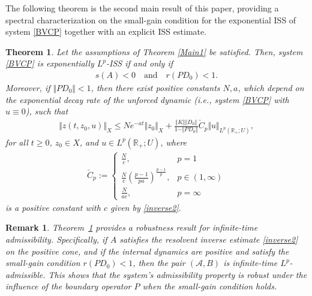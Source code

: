 \documentclass[onecolumn]{autart}
\def\R{{\mathbb{R}}}
\def\R{\mathbb R}
\newtheorem{theorem}{Theorem}[section]  %
\newtheorem{remark}{Remark}[section]
\numberwithin{equation}{section}
\begin{document}
	The following theorem is the second main result of this paper, providing a spectral characterization on the small-gain condition for the  exponential ISS of system \eqref{BVCP} together with an explicit ISS estimate.
	
	\begin{theorem}\label{Main2}
		Let the assumptions of Theorem \ref{Main1} be satisfied. Then, system \eqref{BVCP} is exponentially $L^p$-ISS if and only if
		\begin{align}\label{characterization}
			s(A) < 0 \quad \text{and} \quad r(P D_0) < 1.
		\end{align}
		Moreover, if $\Vert P D_0\Vert<1$, then there exist positive constants $N,a $, which  depend on the exponential decay rate of  the unforced  dynamic (i.e., system \eqref{BVCP} with $u \equiv 0$), such that
		\begin{align}\label{ISS-estimate}
			\Vert z(t,z_0,u)\Vert_X \le  N e^{-a t}\Vert z_0 \Vert_X + \frac{\Vert K \Vert \Vert D_0 \Vert}{1-\Vert P D_0 \Vert} \check{C}_p \Vert u \Vert_{L^p(\R_+; U)},
		\end{align}
		for all $t \ge 0$, $z_0 \in X$, and $u \in L^p(\R_+; U)$, where
		\begin{align*}
			\check{C}_p := \begin{cases}
				\frac{N}{c}, & p = 1 \\
				\frac{N}{c} \left( \frac{p-1}{p a} \right)^{\frac{p-1}{p}}, & p\in(1,\infty) \\
				\frac{N}{a c}  , & p=\infty
			\end{cases}
		\end{align*}
		is  a positive constant  with $c$ given by \eqref{inverse2}.
	\end{theorem}	
	
	    \begin{remark}
        Theorem~\ref{Main2} provides a robustness result for infinite-time admissibility. Specifically, if $A$ satisfies the resolvent inverse estimate \eqref{inverse2} on the positive cone, and if the internal dynamics are positive and satisfy the small-gain condition $r(P D_0) < 1$, then the pair $(\mathcal{A},B)$ is infinite-time $L^p$-admissible. This shows that the system's admissibility property is robust under the influence of the boundary operator $P$ when the small-gain condition holds.
        \end{remark}
	
\end{document}
